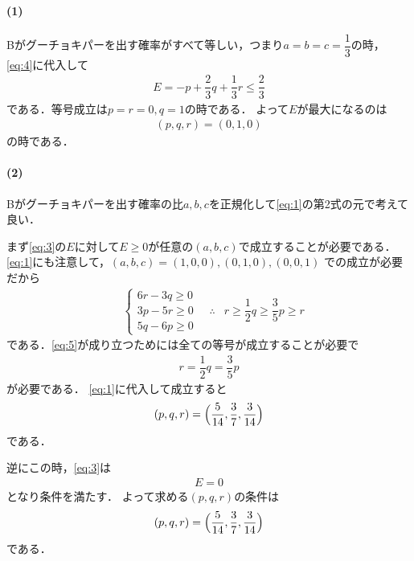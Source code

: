 \documentclass[../../main.tex]{subfiles}
\begin{document}
\paragraph{(1)}

Bがグーチョキパーを出す確率がすべて等しい，つまり$a=b=c=\dfrac{1}{3}$の時，
\cref{eq:4}に代入して
\begin{align}
  E = -p + \dfrac{2}{3} q + \dfrac{1}{3} r \le \dfrac{2}{3}
\end{align}
である．等号成立は$p=r=0, q=1$の時である．
よって$E$が最大になるのは
\begin{align}
  (p, q, r) = (0, 1, 0)
\end{align}
の時である．

\paragraph{(2)}

Bがグーチョキパーを出す確率の比$a,b,c$を正規化して\cref{eq:1}の第2式の元で考えて良い．

まず\cref{eq:3}の$E$に対して$E \ge 0$が任意の$(a,b,c)$で成立することが必要である．
\cref{eq:1}にも注意して，$(a,b,c) = (1,0,0), (0,1,0), (0,0,1)$ での成立が必要だから
\begin{align}
  &
  \begin{cases}
    6r - 3q \ge 0 \\
    3p - 5r \ge 0 \\
    5q - 6p \ge 0
  \end{cases}
  \quad \therefore
  & r \ge \dfrac{1}{2} q \ge \dfrac{3}{5} p \ge r \label{eq:5}
\end{align}
である．\cref{eq:5}が成り立つためには全ての等号が成立することが必要で
\begin{align}
  r = \dfrac{1}{2} q = \dfrac{3}{5} p
\end{align}
が必要である．
\cref{eq:1}に代入して成立すると
\begin{align}
  (p, q, r) = \Bigl( \dfrac{5}{14}, \dfrac{3}{7}, \dfrac{3}{14} \Bigr) \label{eq:6}
\end{align}
である．

逆にこの時，\cref{eq:3}は
\begin{align}
  E = 0
\end{align}
となり条件を満たす．
よって求める$(p,q,r)$の条件は
\begin{align}
  (p, q, r) = \Bigl( \dfrac{5}{14}, \dfrac{3}{7}, \dfrac{3}{14} \Bigr)
\end{align}
である．
\end{document}
